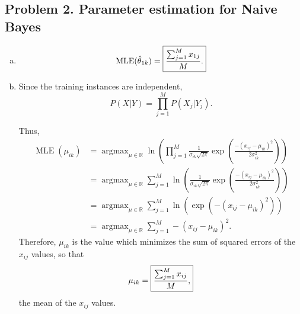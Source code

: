 \documentclass[11pt]{article}
\newcommand{\argmax}{\operatorname{argmax}}
\newcommand{\R}{\mathbb{R}} %
\begin{document}
\subsection*{Problem 2. Parameter estimation for Naive Bayes}
\begin{enumerate}[a.]
\item
\[\operatorname{MLE}(\hat{\theta}_{1k})
 = \mbox{\fbox{$\displaystyle \frac{\sum_{j = 1}^M x_{1j}}{M}$.}}\]

\item Since the training instances are independent,
\[P(X | Y)
 = \prod_{j = 1}^M P(X_j | Y_j).\]

Thus,
\begin{align*}
\operatorname{MLE}(\mu_{ik})
 & = \argmax_{\mu \in \R} \ln \left( \prod_{j = 1}^M \frac{1}{\sigma_{ik}\sqrt{2\pi}}\exp\left( \frac{-(x_{ij} - \mu_{ik})^2}{2\sigma_{ik}^2} \right) \right) \\
 & = \argmax_{\mu \in \R} \sum_{j = 1}^M \ln \left( \frac{1}{\sigma_{ik}\sqrt{2\pi}}\exp\left( \frac{-(x_{ij} - \mu_{ik})^2}{2\sigma_{ik}^2} \right) \right) \\
 & = \argmax_{\mu \in \R} \sum_{j = 1}^M \ln \left( \exp\left( -(x_{ij} - \mu_{ik})^2 \right) \right) \\
 & = \argmax_{\mu \in \R} \sum_{j = 1}^M -(x_{ij} - \mu_{ik})^2.
\end{align*}
Therefore, $\mu_{ik}$ is the value which minimizes the sum of squared errors
of the $x_{ij}$ values, so that \[\mu_{ik} = \mbox{\fbox{$\displaystyle \frac{\sum_{j = 1}^M x_{ij}}{M}$,}}\]
the mean of the $x_{ij}$ values.
\end{enumerate}
\end{document}
